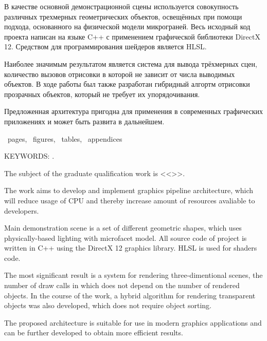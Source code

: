 В качестве основной демонстрационной сцены используется совокупность различных трехмерных геометрических объектов, освещённых при помощи подхода, основанного на физической модели микрограней. Весь исходный код проекта написан на языке C++ с применением графической библиотеки DirectX 12. Средством для программирования шейдеров является HLSL.

Наиболее значимым результатом является система для вывода трёхмерных сцен, количество вызовов отрисовки в которой не зависит от числа выводимых объектов. В ходе работы был также разработан гибридный алгортм отрисовки прозрачных объектов, который не требует их упорядочивания.

Предложенная архитектура пригодна для применения в современных графических приложениях и может быть развита в дальнейшем.


\newpage

\printTheAbstract %


~pages, 
~figures, 
~tables,
~appendices%

{\MakeUppercase{Keywords: \keywordsEn}.} %
	
The subject of the graduate qualification work is <<\thesisTitleEn>>.

The work aims to develop and implement graphics pipeline architecture, which will reduce usage of CPU and thereby increase amount of resources avaliable to developers.

Main demonstration scene is a set of different geometric shapes, which uses physically-based lighting with microfacet model. All source code of project is written in C++ using the DirectX 12 graphics library. HLSL is used for shaders code.

The most significant result is a system for rendering three-dimentional scenes, the number of draw calls in which does not depend on the number of rendered objects. In the course of the work, a hybrid algorithm for rendering transparent objects was also developed, which does not require object sorting.

The proposed architecture is suitable for use in modern graphics applications and can be further developed to obtain more efficient results.
	
	

\newpage
\thispagestyle{empty}
%
